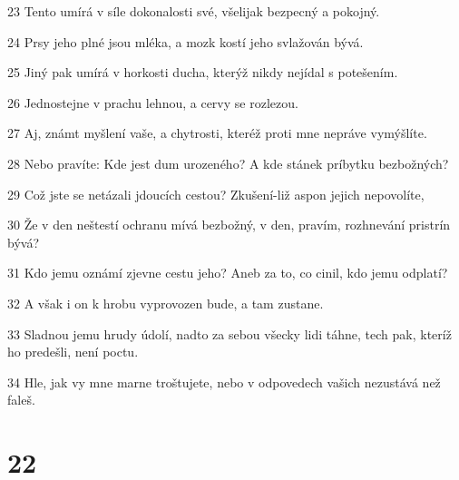 \par 23 Tento umírá v síle dokonalosti své, všelijak bezpecný a pokojný.
\par 24 Prsy jeho plné jsou mléka, a mozk kostí jeho svlažován bývá.
\par 25 Jiný pak umírá v horkosti ducha, kterýž nikdy nejídal s potešením.
\par 26 Jednostejne v prachu lehnou, a cervy se rozlezou.
\par 27 Aj, známt myšlení vaše, a chytrosti, kteréž proti mne nepráve vymýšlíte.
\par 28 Nebo pravíte: Kde jest dum urozeného? A kde stánek príbytku bezbožných?
\par 29 Což jste se netázali jdoucích cestou? Zkušení-liž aspon jejich nepovolíte,
\par 30 Že v den neštestí ochranu mívá bezbožný, v den, pravím, rozhnevání pristrín bývá?
\par 31 Kdo jemu oznámí zjevne cestu jeho? Aneb za to, co cinil, kdo jemu odplatí?
\par 32 A však i on k hrobu vyprovozen bude, a tam zustane.
\par 33 Sladnou jemu hrudy údolí, nadto za sebou všecky lidi táhne, tech pak, kteríž ho predešli, není poctu.
\par 34 Hle, jak vy mne marne troštujete, nebo v odpovedech vašich nezustává než faleš.

\chapter{22}

